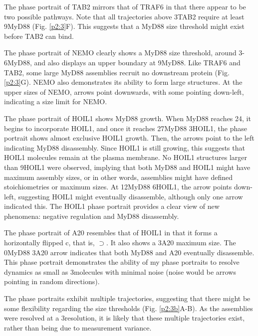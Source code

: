 The phase portrait of TAB2 mirrors that of TRAF6 in that there appear to be two possible pathways. Note that all trajectories above 3\times TAB2 require at least 9\times MyD88 (Fig. \ref{p2:3}F). This suggests that a MyD88 size threshold might exist before TAB2 can bind.

The phase portrait of NEMO clearly shows a MyD88 size threshold, around 3-6\times MyD88, and also displays an upper boundary at 9\times MyD88. Like TRAF6 and TAB2, some large MyD88 assemblies recruit no downstream protein (Fig. \ref{p2:3}G). NEMO also demonstrates its ability to form large structures. At the upper sizes of NEMO, arrows point downwards, with some pointing down-left, indicating a size limit for NEMO.

The phase portrait of HOIL1 shows MyD88 growth. When MyD88 reaches 24\times, it begins to incorporate HOIL1, and once it reaches 27\times MyD88 3\times HOIL1, the phase portrait shows almost exclusive HOIL1 growth. Then, the arrows point to the left indicating MyD88 disassembly. Since HOIL1 is still growing, this suggests that HOIL1 molecules remain at the plasma membrane. No HOIL1 structures larger than 9\times HOIL1 were observed, implying that both MyD88 and HOIL1 might have maximum assembly sizes, or in other words, assemblies might have defined stoichiometries or maximum sizes. At 12\times MyD88 6\times HOIL1, the arrow points down-left, suggesting HOIL1 might eventually disassemble, although only one arrow indicated this. The HOIL1 phase portrait provides a clear view of new phenomena: negative regulation and MyD88 disassembly.

The phase portrait of A20 resembles that of HOIL1 in that it forms a horizontally flipped c, that is, $\supset$. It also shows a 3\times A20 maximum size. The 0\times MyD88 3\times A20 arrow indicates that both MyD88 and A20 eventually disassemble. This phase portrait demonstrates the ability of my phase portraits to resolve dynamics as small as 3\times molecules with minimal noise (noise would be arrows pointing in random directions).

The phase portraits exhibit multiple trajectories, suggesting that there might be some flexibility regarding the size thresholds (Fig. \ref{p2:3b}A-B). As the assemblies were resolved at a 3\times resolution, it is likely that these multiple trajectories exist, rather than being due to measurement variance.


